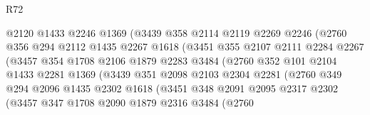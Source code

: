 \begin{lexlean}{R72}
\begin{coremodule}
                          @2120
                          @1433
                          @2246
                          @1369
                          (@3439
                            @358
                            @2114
                            @2119
                            @2269
                            @2246
                            (@2760
                              @356
                              @294
                              @2112
                              @1435
                              @2267
                              @1618
                              (@3451
                                @355
                                @2107
                                @2111
                                @2284
                                @2267
                                (@3457
                                  @354
                                  @1708
                                  @2106
                                  @1879
                                  @2283
                                  @3484
                                  (@2760
                                    @352
                                    @101
                                    @2104
                                    @1433
                                    @2281
                                    @1369
                                    (@3439
                                      @351
                                      @2098
                                      @2103
                                      @2304
                                      @2281
                                      (@2760
                                        @349
                                        @294
                                        @2096
                                        @1435
                                        @2302
                                        @1618
                                        (@3451
                                          @348
                                          @2091
                                          @2095
                                          @2317
                                          @2302
                                          (@3457
                                            @347
                                            @1708
                                            @2090
                                            @1879
                                            @2316
                                            @3484
                                            (@2760

\end{coremodule}
\end{lexlean}
